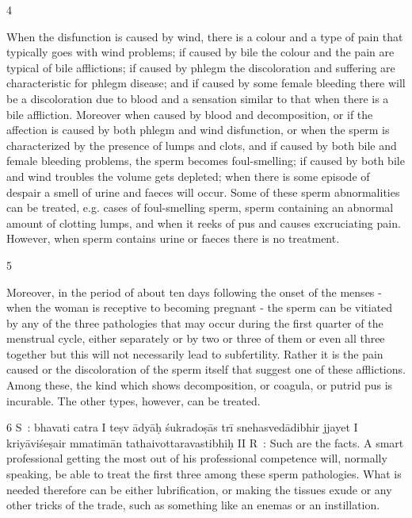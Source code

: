 \begin{translation}
 \item[4]
 
  When the disfunction is caused by wind, there is a colour and a type of pain 
  that typically goes with wind problems; if  caused by bile the colour and the 
  pain are typical of bile afflictions; if caused by phlegm the discoloration and 
  suffering are characteristic for phlegm disease; and if caused by some female 
  bleeding there will be a discoloration due to blood and a sensation similar to 
  that when there is a bile affliction. Moreover when caused by blood and 
  decomposition, or if the affection is caused by both phlegm and wind 
  disfunction, or when the sperm is characterized by the presence of lumps and 
  clots, and if caused by both bile and female bleeding problems, the sperm 
  becomes foul-smelling; if caused by both bile and wind troubles the volume gets 
  depleted; when there is some episode of despair a smell of urine and faeces will 
  occur. Some of these sperm abnormalities can be treated, e.g. cases of 
  foul-smelling sperm, sperm containing an abnormal amount of clotting lumps, 
  and when it reeks of pus and causes excruciating pain. However, when sperm 
  contains urine or faeces there is no treatment.
 
 \item[5]
 
  Moreover, in the period of about ten days following the onset of the menses - 
  when the woman is receptive to becoming pregnant - the sperm can be vitiated 
  by any of the three pathologies that may occur during the first quarter of the 
  menstrual cycle, either separately or by two or three of them or even all three 
  together but this will not necessarily lead to subfertility. Rather it is  the pain 
  caused or the discoloration of the sperm itself that suggest one of these 
  afflictions. Among these, the kind which shows decomposition, or coagula, or 
  putrid pus is incurable. The other types, however, can be treated.  
 
 \item[6]
 S : bhavati catra I teṣv ādyāḥ śukradoṣās trī snehasvedādibhir jjayet I 
 kriyāviśeṣair mmatimān tathaivottaravastibhiḥ II
 R : Such are the facts. A smart professional getting the most out of his 
 professional competence will, normally speaking, be able to treat the first three 
 among these sperm pathologies. What is needed therefore can be either 
 lubrification, or making the tissues exude or any other tricks of the trade, such 
 as something like an enemas or an instillation.
 

\end{translation}
